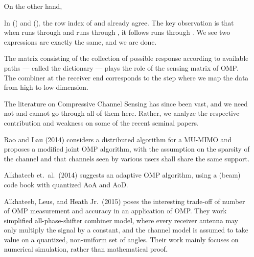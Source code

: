 On the other hand,


In () and (), the row index of  and  already agree.
The key observation is that when  runs through  and  runs through , it follows  runs through .
We see two expressions are exactly the same, and we are done.

The matrix consisting of the collection of possible response according to available paths --- called the dictionary --- plays the role of the sensing matrix of OMP.
The combiner at the receiver end corresponds to the step where we map the data from high to low dimension.

\stopsection
\startsection [title={Further Development on Compressive Channel Sensing}]

The literature on Compressive Channel Sensing has since been vast, and we need not and cannot go through all of them here.
Rather, we analyze the respective contribution and weakness on some of the recent seminal papers.

Rao and Lau (2014) considers a distributed algorithm for a MU-MIMO and proposes a modified joint OMP algorithm, with the assumption on the sparsity of the channel and that channels seen by various users shall share the same support.

Alkhateeb et.\ al.\ (2014) suggests an adaptive OMP algorithm, using a (beam) code book with quantized AoA and AoD.

Alkhateeb, Leus, and Heath Jr.\ (2015) poses the interesting trade-off of number of OMP measurement and accuracy in an application of OMP.
They work simplified all-phase-shifter combiner model, where every receiver antenna may only multiply the signal by a constant, and the channel model is assumed to take value on a quantized, non-uniform set of angles.
Their work mainly focuses on numerical simulation, rather than mathematical proof.

